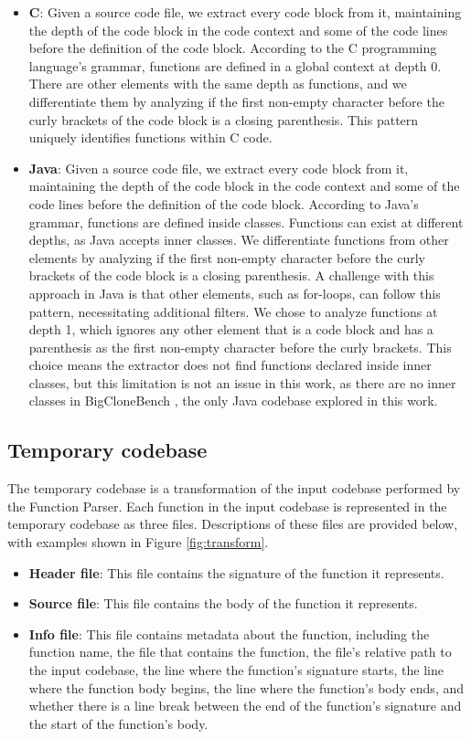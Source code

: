 \begin{itemize}
	\item \textbf{C}: Given a source code file, we extract every code block from it, maintaining the depth of the code block in the code context and some of the code lines before the definition of the code block. According to the C programming language's grammar, functions are defined in a global context at depth 0. There are other elements with the same depth as functions, and we differentiate them by analyzing if the first non-empty character before the curly brackets of the code block is a closing parenthesis. This pattern uniquely identifies functions within C code.

	\item \textbf{Java}:  Given a source code file, we extract every code block from it, maintaining the depth of the code block in the code context and some of the code lines before the definition of the code block. According to Java's grammar, functions are defined inside classes. Functions can exist at different depths, as Java accepts inner classes. We differentiate functions from other elements by analyzing if the first non-empty character before the curly brackets of the code block is a closing parenthesis. A challenge with this approach in Java is that other elements, such as for-loops, can follow this pattern, necessitating additional filters. We chose to analyze functions at depth 1, which ignores any other element that is a code block and has a parenthesis as the first non-empty character before the curly brackets. This choice means the extractor does not find functions declared inside inner classes, but this limitation is not an issue in this work, as there are no inner classes in BigCloneBench \citep{bigclonebench}, the only Java codebase explored in this work.
\end{itemize}

\subsection{Temporary codebase}

The temporary codebase is a transformation of the input codebase performed by the Function Parser. Each function in the input codebase is represented in the temporary codebase as three files. Descriptions of these files are provided below, with examples shown in Figure \ref{fig:transform}.

\begin{itemize}
	\item \textbf{Header file}: This file contains the signature of the function it represents.
	\item \textbf{Source file}: This file contains the body of the function it represents.
	\item \textbf{Info file}: This file contains metadata about the function, including the function name, the file that contains the function, the file's relative path to the input codebase, the line where the function's signature starts, the line where the function body begins, the line where the function's body ends, and whether there is a line break between the end of the function's signature and the start of the function's body.
\end{itemize}

